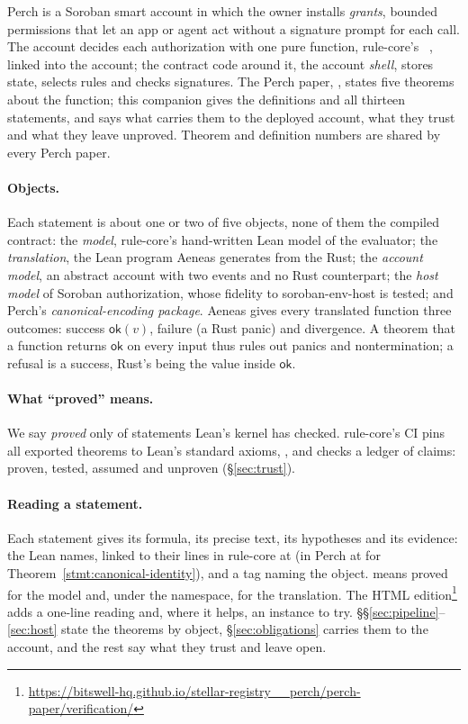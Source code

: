 Perch is a Soroban smart account in which the owner installs \emph{grants},
bounded permissions that let an app or agent act without a signature prompt for
each call. The account decides each authorization with one pure function,
rule-core's \allowbreak{}~\cite{rule-core},
linked into the account; the contract code around it, the account \emph{shell},
stores state, selects rules and checks signatures. The Perch paper,
, states five theorems about the function; this companion gives
the definitions and all thirteen statements, and says what carries them to the
deployed account, what they trust and what they leave unproved. Theorem and
definition numbers are shared by every Perch paper.

\paragraph{Objects.} Each statement is about one or two of five objects, none of
them the compiled contract: the \emph{model}, rule-core's hand-written Lean model
of the evaluator; the \emph{translation}, the Lean program Aeneas generates from
the Rust; the \emph{account model}, an abstract account with two events and no
Rust counterpart; the \emph{host model} of Soroban authorization, whose fidelity
to soroban-env-host is tested; and Perch's \emph{canonical-encoding package}.
Aeneas gives every translated function three outcomes: success
$\mathsf{ok}(v)$, failure (a Rust panic) and divergence. A theorem that a function
returns $\mathsf{ok}$ on every input thus rules out panics and nontermination; a
refusal is a success, Rust's  being the value inside
$\mathsf{ok}$.

\paragraph{What ``proved'' means.} We say \emph{proved} only of statements Lean's
kernel has checked. rule-core's CI pins all  exported
theorems to Lean's standard axioms, , and checks a ledger of
 claims:  proven, 
tested,  assumed and  unproven
(\S\ref{sec:trust}).

\paragraph{Reading a statement.} Each statement gives its formula, its precise
text, its hypotheses and its evidence: the Lean names, linked to their lines in
rule-core at  (in Perch at  for
Theorem~\ref{stmt:canonical-identity}), and a tag naming the object.
 means proved for the model and, under the
 namespace, for the translation. The HTML
edition\footnote{\url{https://bitswell-hq.github.io/stellar-registry__perch/perch-paper/verification/}}
adds a one-line reading and, where it helps, an instance to try.
\S\S\ref{sec:pipeline}--\ref{sec:host} state the theorems by object,
\S\ref{sec:obligations} carries them to the account, and the rest say what they
trust and leave open.
